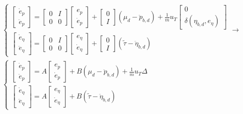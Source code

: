 \begin{gather*}
    \begin{cases}
        \begin{bmatrix}
            \dot{e}_p \\ \ddot{e}_p
        \end{bmatrix}=
        \begin{bmatrix}
            0 & I \\ 0 & 0
        \end{bmatrix}
        \begin{bmatrix}
            e_p \\ \dot{e}_p
        \end{bmatrix}+
        \begin{bmatrix}
            0 \\ I
        \end{bmatrix}
        \left(\mu_d-\ddot{p}_{b,d}\right)+\frac{1}{m}u_{T}
        \begin{bmatrix}
            0 \\ \delta(\eta_{b,d},e_\eta)
        \end{bmatrix}\\
        \begin{bmatrix}
            \dot{e}_\eta \\ \ddot{e}_\eta
        \end{bmatrix}=
        \begin{bmatrix}
            0 & I \\ 0 & 0
        \end{bmatrix}
        \begin{bmatrix}
            e_\eta \\ \dot{e}_\eta
        \end{bmatrix}+
        \begin{bmatrix}
            0 \\ I
        \end{bmatrix}
        \left(\tilde{\tau}-\ddot{\eta}_{b,d}\right)
    \end{cases} \rightarrow \\
    \begin{cases}
        \begin{bmatrix}
            \dot{e}_p \\ \ddot{e}_p
        \end{bmatrix}=A
        \begin{bmatrix}
            e_p \\ \dot{e}_p
        \end{bmatrix}+B
        \left(\mu_d-\ddot{p}_{b,d}\right)+\frac{1}{m}u_{T}
        \Delta\\
        \begin{bmatrix}
            \dot{e}_\eta \\ \ddot{e}_\eta
        \end{bmatrix}=A
        \begin{bmatrix}
            e_\eta \\ \dot{e}_\eta
        \end{bmatrix}+B
        \left(\tilde{\tau}-\ddot{\eta}_{b,d}\right)
    \end{cases}
\end{gather*}
